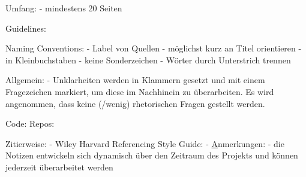 Umfang:
 - mindestens 20 Seiten

Guidelines:

 Naming Conventions:
  - Label von Quellen 
    - möglichst kurz an Titel orientieren
    - in Kleinbuchstaben
    - keine Sonderzeichen
    - Wörter durch Unterstrich trennen
  
 Allgemein:
  - Unklarheiten werden in Klammern gesetzt und mit einem Fragezeichen markiert, um diese im Nachhinein zu überarbeiten. Es wird angenommen, dass keine (/wenig) rhetorischen Fragen gestellt werden.

  Code:
    Repos:

  Zitierweise:
   - Wiley Harvard Referencing Style Guide: 
     - \href{https://onlinelibrary.wiley.com/pb-assets/assets/10969837/Wiley_Harvard%20Reference%20Style%20Guide_1.0-1581524201813.pdf}
   

Anmerkungen:
 - die Notizen entwickeln sich dynamisch über den Zeitraum des Projekts und können jederzeit überarbeitet werden